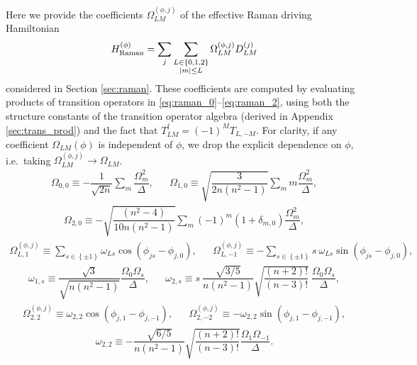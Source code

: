\documentclass[nofootinbib,notitlepage,11pt]{revtex4-2}
\renewcommand{\t}{\text} %
\newcommand{\f}[2]{\dfrac{#1}{#2}} %
\newcommand{\p}[1]{\left(#1\right)} %
\renewcommand{\set}[1]{\left\{#1\right\}} %
\newcommand{\1}{\mathds{1}}
\begin{document}
Here we provide the coefficients $\Omega_{LM}^{(\phi,j)}$ of the
effective Raman driving Hamiltonian
\begin{align}
  H_{\t{Raman}}^{(\phi)}
  = \sum_j \sum_{\substack{L\in\set{0,1,2}\\\abs{m}\le L}}
  \Omega_{LM}^{(\phi,j)} D_{LM}^{(j)}
\end{align}
considered in Section \ref{sec:raman}.  These coefficients are
computed by evaluating products of transition operators in
\eqref{eq:raman_0}--\eqref{eq:raman_2}, using both the structure
constants of the transition operator algebra (derived in Appendix
\ref{sec:trans_prod}) and the fact that
$T_{LM}^\dag = \p{-1}^M T_{L,-M}$.  For clarity, if any coefficient
$\Omega_{LM}\p{\phi}$ is independent of $\phi$, we drop the explicit
dependence on $\phi$, i.e.~taking
$\Omega_{LM}^{(\phi,j)}\to\Omega_{LM}$.
\begin{align}
  \Omega_{0,0} \equiv -\f1{\sqrt{2n}} \sum_m\f{\Omega_m^2}{\Delta},
  &&
  \Omega_{1,0} \equiv \sqrt{\f{3}{2n\p{n^2-1}}}
  \sum_m m\f{\Omega_m^2}{\Delta},
\end{align}
\begin{align}
  \Omega_{2,0} \equiv -\sqrt{\f{\p{n^2-4}}{10n\p{n^2-1}}}
  \sum_m \p{-1}^m \p{1+\delta_{m,0}} \f{\Omega_m^2}{\Delta},
\end{align}
\begin{align}
  \Omega_{L,1}^{(\phi,j)}
  \equiv \sum_{s\in\set{\pm1}} \omega_{Ls} \cos\p{\phi_{js}-\phi_{j,0}},
  &&
  \Omega_{L,-1}^{(\phi,j)}
  \equiv -\sum_{s\in\set{\pm1}}
  s~ \omega_{Ls} \sin\p{\phi_{js}-\phi_{j,0}},
\end{align}
\begin{align}
  \omega_{1,s} \equiv \f{\sqrt3}{\sqrt{n\p{n^2-1}}}
  \f{\Omega_0 \Omega_s}{\Delta},
  &&
  \omega_{2,s} \equiv s~ \f{\sqrt{3/5}}{n\p{n^2-1}}
  \sqrt{\f{\p{n+2}!}{\p{n-3}!}}~ \f{\Omega_0\Omega_s}{\Delta},
\end{align}
\begin{align}
  \Omega_{2,2}^{(\phi,j)}
  \equiv \omega_{2,2} \cos\p{\phi_{j,1}-\phi_{j,-1}},
  &&
  \Omega_{2,-2}^{(\phi,j)}
  \equiv -\omega_{2,2} \sin\p{\phi_{j,1}-\phi_{j,-1}},
\end{align}
\begin{align}
  \omega_{2,2} \equiv -\f{\sqrt{6/5}}{n\p{n^2-1}}
  \sqrt{\f{\p{n+2}!}{\p{n-3}!}} \f{\Omega_1\Omega_{-1}}{\Delta}.
\end{align}



\end{document}

